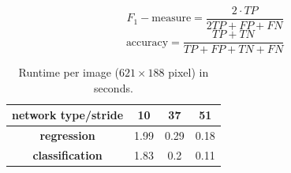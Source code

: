 \begin{equation} \label{eq:fMeasure}
F_1-\text{measure} = \frac{2 \cdot TP}{2TP +FP +FN}
\end{equation}
\begin{equation} \label{eq:accuracy}
\text{accuracy} = \frac{TP + TN}{TP + FP + TN + FN}
\end{equation}

 \begin{table}[]
 	\begin{center}
 		\begin{tabular}{c|ccc}
 			\toprule
 			\textbf{network type/stride} & \textbf{10} & \textbf{37} & \textbf{51} \\
 			\midrule
 			\textbf{regression} & 1.99 & 0.29 & 0.18 \\
 			\textbf{classification} & 1.83 & 0.2 & 0.11\\
 			\bottomrule
 		\end{tabular}
 		\caption{Runtime per image ($621 \times 188$ pixel) in seconds.}
 		\label{tab:runtime}
 	\end{center}
 \end{table}

